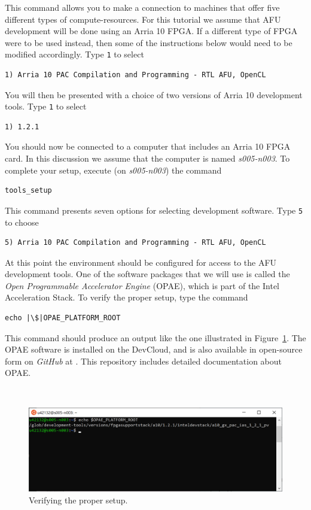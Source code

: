 \documentclass[11pt, twoside, pdftex]{article}
\newcommand{\blue}[1]{{\color{blue}\sf{#1}}}
\begin{document}
This command allows you to make a connection to machines that offer five different types of
compute-resources. For this tutorial we assume that AFU development will be done using 
an Arria 10 FPGA. If a different type of FPGA were to be used instead, then some of the 
instructions below would need to be modified accordingly.  Type \texttt{1} to select
\begin{lstlisting}
1) Arria 10 PAC Compilation and Programming - RTL AFU, OpenCL
\end{lstlisting}
You will then be presented with a choice of two versions of Arria 10 development tools. 
Type \texttt{1} to select
\begin{lstlisting}
1) 1.2.1
\end{lstlisting}

You should now be connected to a computer that includes an Arria 10 FPGA card. In this
discussion we assume that the computer is named {\it s005-n003}. To complete your setup, 
execute (on {\it s005-n003}) the command
\begin{lstlisting}
tools_setup
\end{lstlisting}

This command presents seven options for selecting development software. Type \texttt{5} to
choose
\begin{lstlisting}
5) Arria 10 PAC Compilation and Programming - RTL AFU, OpenCL
\end{lstlisting}

At this point the environment should be configured for access to the AFU development tools.
One of the software packages that we will use is called the 
{\it Open Programmable Accelerator Engine} (OPAE), which is part of the Intel Acceleration
Stack.  To verify the proper setup, type the command
\begin{lstlisting}
echo |\$|OPAE_PLATFORM_ROOT
\end{lstlisting}

This command should produce an output like the one illustrated in Figure~\ref{fig:setup}.
The OPAE software is installed on the DevCloud, and is also available in open-source form on
{\it GitHub} at \blue{https://github.com/OPAE}. This repository includes detailed documentation 
about OPAE.

~\\
\begin{figure}[H]
   \begin{center}
      \includegraphics[width=\textwidth]{figures/setup.png}
   \caption{Verifying the proper setup.} 
	 \label{fig:setup}
	 \end{center}
\end{figure}
\end{document}
